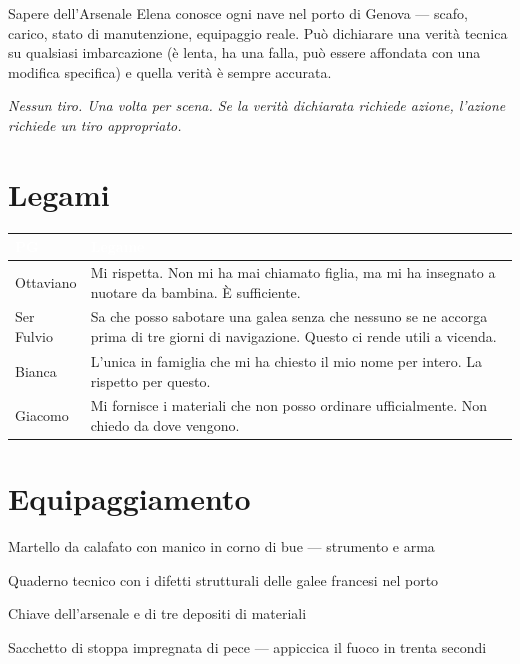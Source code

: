
\begin{doriabox}{Sapere dell'Arsenale}
  Elena conosce ogni nave nel porto di Genova — scafo, carico, stato di
  manutenzione, equipaggio reale. Può dichiarare una verità tecnica su
  qualsiasi imbarcazione (è lenta, ha una falla, può essere affondata con
  una modifica specifica) e quella verità è sempre accurata.

  \medskip\noindent\textit{Nessun tiro. Una volta per scena. Se la verità
  dichiarata richiede azione, l'azione richiede un tiro appropriato.}
\end{doriabox}

\section*{Legami}

\begin{table}[h]
\centering\renewcommand{\arraystretch}{1.4}
\begin{tabularx}{\linewidth}{@{}L{2.4cm} X@{}}
  \toprule{}
  \textcolor{white}{\textbf{PG}} & \textcolor{white}{\textbf{Legame}} \\
  \midrule
  Ottaviano & Mi rispetta. Non mi ha mai chiamato figlia, ma mi ha insegnato
             a nuotare da bambina. È sufficiente. \\
  Ser Fulvio & Sa che posso sabotare una galea senza che nessuno se ne accorga
              prima di tre giorni di navigazione. Questo ci rende utili a vicenda. \\
  Bianca & L'unica in famiglia che mi ha chiesto il mio nome per intero.
           La rispetto per questo. \\
  Giacomo & Mi fornisce i materiali che non posso ordinare ufficialmente.
            Non chiedo da dove vengono. \\
  \bottomrule
\end{tabularx}
\end{table}

\section*{Equipaggiamento}
\begin{goldlist}
  \item Martello da calafato con manico in corno di bue --- strumento e arma
  \item Quaderno tecnico con i difetti strutturali delle galee francesi nel porto
  \item Chiave dell'arsenale e di tre depositi di materiali
  \item Sacchetto di stoppa impregnata di pece --- appiccica il fuoco in trenta secondi
\end{goldlist}

